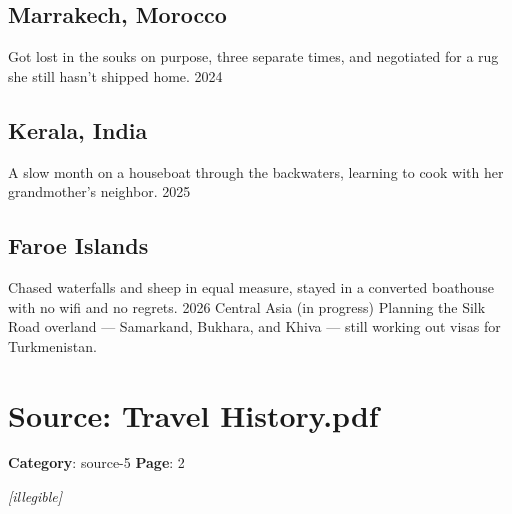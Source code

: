 \subsection*{Marrakech, Morocco}

Got lost in the souks on purpose, three separate times, and negotiated for a rug she still hasn't shipped home. 2024

\subsection*{Kerala, India}

A slow month on a houseboat through the backwaters, learning to cook with her grandmother's neighbor. 2025

\subsection*{Faroe Islands}

Chased waterfalls and sheep in equal measure, stayed in a converted boathouse with no wifi and no regrets. 2026 Central Asia (in progress) Planning the Silk Road overland — Samarkand, Bukhara, and Khiva — still working out visas for Turkmenistan.

\newpage

\section*{Source: Travel History.pdf}
\textbf{Category}: source-5
\textbf{Page}: 2

\textit{[illegible]}